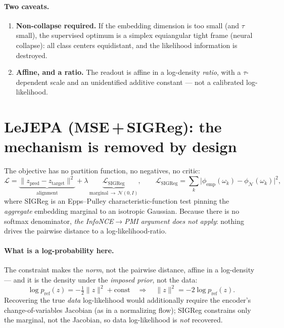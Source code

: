 \documentclass[11pt]{article}
\begin{document}
\paragraph{Two caveats.}
\begin{enumerate}
\item \textbf{Non-collapse required.} If the embedding dimension is too small
(and $\tau$ small), the supervised optimum is a simplex equiangular tight frame
(neural collapse): all class centers equidistant, and the likelihood
information is destroyed.
\item \textbf{Affine, and a ratio.} The readout is affine in a log-density
\emph{ratio}, with a $\tau$-dependent scale and an unidentified additive
constant --- not a calibrated log-likelihood.
\end{enumerate}

\section{LeJEPA (MSE\,+\,SIGReg): the mechanism is removed by design}
The objective has no partition function, no negatives, no critic:
\begin{equation}
\mathcal{L}
= \underbrace{\bigl\|z_{\mathrm{pred}} - z_{\mathrm{target}}\bigr\|^2}_{\text{alignment}}
+ \lambda\,
\underbrace{\mathcal{L}_{\mathrm{SIGReg}}}_{\text{marginal}\,\to\,\mathcal{N}(0,I)},
\qquad
\mathcal{L}_{\mathrm{SIGReg}}
= \sum_k \bigl|\phi_{\mathrm{emp}}(\omega_k) - \phi_{\mathcal{N}}(\omega_k)\bigr|^2,
\end{equation}
where SIGReg is an Epps--Pulley characteristic-function test pinning the
\emph{aggregate} embedding marginal to an isotropic Gaussian. Because there is
no softmax denominator, \emph{the InfoNCE$\to$PMI argument does not apply}:
nothing drives the pairwise distance to a log-likelihood-ratio.

\paragraph{What is a log-probability here.}
The constraint makes the \emph{norm}, not the pairwise distance, affine in a
log-density --- and it is the density under the \emph{imposed prior}, not the
data:
\begin{equation}
\log p_{\mathrm{ref}}(z) = -\tfrac12\|z\|^2 + \text{const}
\quad\Longrightarrow\quad
\|z\|^2 = -2\log p_{\mathrm{ref}}(z).
\end{equation}
Recovering the true \emph{data} log-likelihood would additionally require the
encoder's change-of-variables Jacobian (as in a normalizing flow); SIGReg
constrains only the marginal, not the Jacobian, so data log-likelihood is
\emph{not} recovered.
\end{document}
